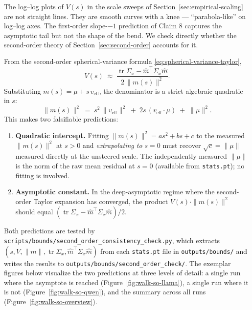 The log--log plots of $V(s)$ in the scale sweeps of
Section~\ref{sec:empirical-scaling} are not straight lines. They are smooth
curves with a knee --- ``parabola-like'' on log--log axes. The first-order
slope-$-1$ prediction of Claim 8 captures the asymptotic tail but not the
shape of the bend. We check directly whether the second-order theory of
Section~\ref{sec:second-order} accounts for it.

From the second-order spherical-variance formula
\eqref{eq:spherical-variance-taylor},
\begin{equation}
  V(s) \;\approx\; \frac{\operatorname{tr}\Sigma_x - \hat{m}^\top \Sigma_x \hat{m}}{2\,\|m(s)\|^2}.
  \label{eq:walk-V-second-order-recap}
\end{equation}
Substituting $m(s) = \mu + s\,v_{\mathrm{eff}}$, the denominator is a strict
algebraic quadratic in $s$:
\begin{equation}
  \|m(s)\|^2
  \;=\; s^2\,\|v_{\mathrm{eff}}\|^2
  \;+\; 2 s\,(v_{\mathrm{eff}} \cdot \mu)
  \;+\; \|\mu\|^2.
  \label{eq:walk-m-quadratic}
\end{equation}
This makes two falsifiable predictions:

\begin{enumerate}
  \item \textbf{Quadratic intercept.} Fitting $\|m(s)\|^2 = a s^2 + b s + c$
    to the measured $\|m(s)\|^2$ at $s > 0$ and \emph{extrapolating to
    $s = 0$} must recover $\sqrt{c} = \|\mu\|$ measured directly at the
    unsteered scale. The independently measured $\|\mu\|$ is the norm of
    the raw mean residual at $s = 0$ (available from \texttt{stats.pt});
    no fitting is involved.
  \item \textbf{Asymptotic constant.} In the deep-asymptotic regime where
    the second-order Taylor expansion has converged, the product
    $V(s) \cdot \|m(s)\|^2$ should equal
    $(\operatorname{tr}\Sigma_x - \hat{m}^\top \Sigma_x \hat{m})/2$.
\end{enumerate}

Both predictions are tested by
\texttt{scripts/bounds/second\_order\_consistency\_check.py}, which extracts
$(s, V, \|m\|, \operatorname{tr}\Sigma_x, \hat{m}^\top \Sigma_x \hat{m})$
from each \texttt{stats.pt} file in \texttt{outputs/bounds/} and writes the
results to \texttt{outputs/bounds/second\_order\_check/}. The exemplar
figures below visualize the two predictions at three levels of detail:
a single run where the asymptote is reached
(Figure~\ref{fig:walk-so-llama}), a single run where it is not
(Figure~\ref{fig:walk-so-qwen}), and the summary across all runs
(Figure~\ref{fig:walk-so-overview}).

